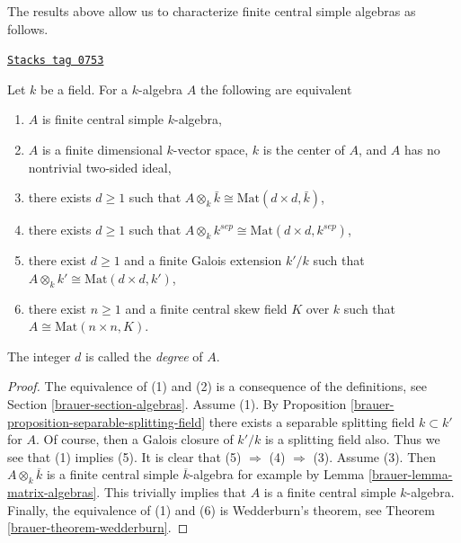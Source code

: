 The results above allow us to characterize finite central simple algebras
as follows.

\begin{lemma}
\label{brauer-lemma-finite-central-simple-algebra}
\href{https://stacks.math.columbia.edu/tag/0753}{\texttt{Stacks tag 0753}}

Let $k$ be a field. For a $k$-algebra $A$ the following are equivalent
\begin{enumerate}
\item $A$ is finite central simple $k$-algebra,
\item $A$ is a finite dimensional $k$-vector space, $k$ is the center of $A$,
and $A$ has no nontrivial two-sided ideal,
\item there exists $d \geq 1$ such that
$A \otimes_k \bar k \cong \text{Mat}(d \times d, \bar k)$,
\item there exists $d \geq 1$ such that
$A \otimes_k k^{sep} \cong \text{Mat}(d \times d, k^{sep})$,
\item there exist $d \geq 1$ and a finite Galois extension $k'/k$
such that
$A \otimes_k k' \cong \text{Mat}(d \times d, k')$,
\item there exist $n \geq 1$ and a finite central skew field $K$
over $k$ such that $A \cong \text{Mat}(n \times n, K)$.
\end{enumerate}
The integer $d$ is called the {\it degree} of $A$.
\end{lemma}

\begin{proof}

The equivalence of (1) and (2) is a consequence of the definitions, see
Section \ref{brauer-section-algebras}.
Assume (1). By
Proposition \ref{brauer-proposition-separable-splitting-field}
there exists a separable splitting field $k \subset k'$ for $A$.
Of course, then a Galois closure of $k'/k$ is a splitting field also.
Thus we see that (1) implies (5). It is clear that (5) $\Rightarrow$ (4)
$\Rightarrow$ (3). Assume (3). Then $A \otimes_k \overline{k}$
is a finite central simple $\overline{k}$-algebra for example by
Lemma \ref{brauer-lemma-matrix-algebras}.
This trivially implies that $A$ is a finite central simple $k$-algebra.
Finally, the equivalence of (1) and (6) is Wedderburn's theorem, see
Theorem \ref{brauer-theorem-wedderburn}.
\end{proof}



